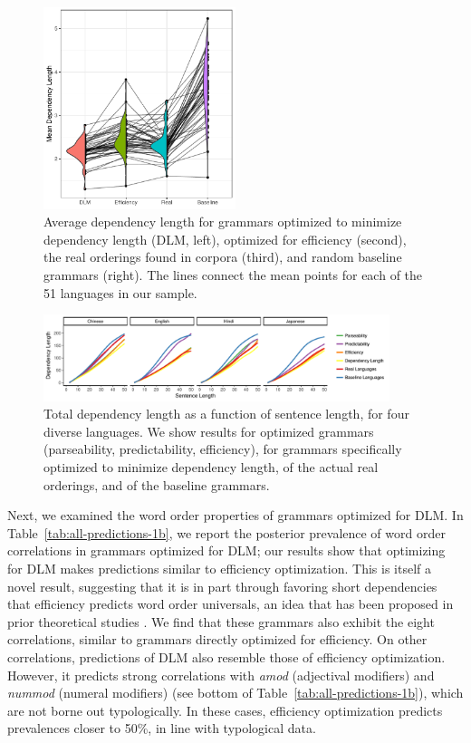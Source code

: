 \documentclass[10pt,twoside,lineno]{article}
\begin{document}
\begin{figure}[ht]
    \centering
     \includegraphics[width=0.5\textwidth]{depl-violin-all-1.png} 
        \caption{Average dependency length for grammars optimized to minimize dependency length (DLM, left), optimized for efficiency (second), the real orderings found in corpora (third), and random baseline grammars (right). The lines connect the mean points for each of the 51 languages in our sample.}
    \label{fig:dlm-avg}
\end{figure}

\begin{figure}[ht]
    \centering
	\includegraphics[width=0.9\textwidth]{depLength-facet-1.png} 
        \caption{Total dependency length as a function of sentence length, for four diverse languages. We show results for optimized grammars (parseability, predictability, efficiency), for grammars specifically optimized to minimize dependency length, of the actual real orderings, and of the baseline grammars.}
    \label{fig:dlm-4langs}
\end{figure}


Next, we examined the word order properties of grammars optimized for DLM.
In Table~\ref{tab:all-predictions-1b}, we report the posterior prevalence of word order correlations in grammars optimized for DLM; our results show that optimizing for DLM makes predictions similar to efficiency optimization.
This is itself a novel result, suggesting that it is in part through favoring short dependencies that efficiency predicts word order universals, an idea that has been proposed in prior theoretical studies \citep{hawkins1994performance, hawkins2004efficiency}.
We find that these grammars also exhibit the eight correlations, similar to grammars directly optimized for efficiency.
On other correlations, predictions of DLM also resemble those of efficiency optimization.
However, it predicts strong correlations with \textit{amod} (adjectival modifiers) and \textit{nummod} (numeral modifiers) (see bottom of Table~\ref{tab:all-predictions-1b}), which are not borne out typologically.
In these cases, efficiency optimization predicts prevalences closer to 50\%, in line with typological data.
\end{document}
